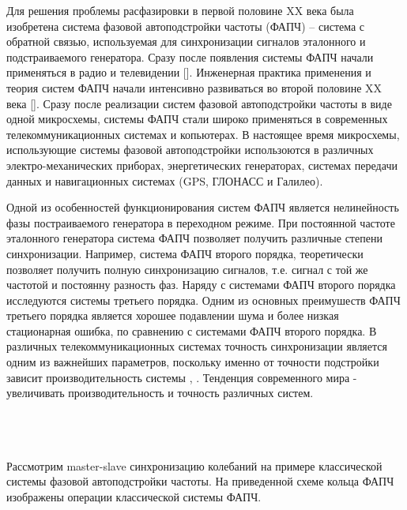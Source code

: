 \documentclass[a4paper,14pt]{extarticle} %
\begin{document}
Для решения проблемы расфазировки в первой половине XX века была изобретена система фазовой автоподстройки частоты (ФАПЧ) -- система с обратной связью, используемая для синхронизации сигналов эталонного и подстраиваемого генератора. Сразу после появления системы ФАПЧ начали применяться в радио и телевидении []. Инженерная практика применения и теория систем ФАПЧ начали интенсивно развиваться во второй половине XX века []. Сразу после реализации систем фазовой автоподстройки частоты в виде одной микросхемы, системы ФАПЧ стали широко применяться в современных телекоммуникационных системах и копьютерах. В настоящее время микросхемы, использующие системы фазовой автоподстройки использоются в различных электро-механических приборах, энергетических генераторах, системах передачи данных и навигационных системах (GPS, ГЛОНАСС и Галилео).

Одной из особенностей функционирования систем ФАПЧ является нелинейность фазы постраиваемого генератора в переходном режиме. При постоянной частоте эталонного генератора система ФАПЧ позволяет получить различные степени синхронизации. Например, система ФАПЧ второго порядка, теоретически позволяет получить полную синхронизацию сигналов, т.е. сигнал с той же частотой и постоянну разность фаз. Наряду с системами ФАПЧ второго порядка исследуются системы третьего порядка. Одним из основных преимушеств ФАПЧ третьего порядка является хорошее подавлении шума и более низкая стационарная ошибка, по сравнению с системами ФАПЧ второго порядка. В различных телекоммуникационных системах точность синхронизации является одним из важнейших параметров, поскольку именно от точности подстройки зависит производительность системы \cite{UsageOfThirdOrder1}, \cite{UsageOfThirdOrder2}. Тенденция современного мира - увеличивать производительность и точность различных систем.
\\\\
\\\\
Рассмотрим master-slave синхронизацию колебаний на примере классической системы фазовой автоподстройки частоты. На приведенной схеме кольца ФАПЧ изображены операции классической системы ФАПЧ. 
\end{document}
